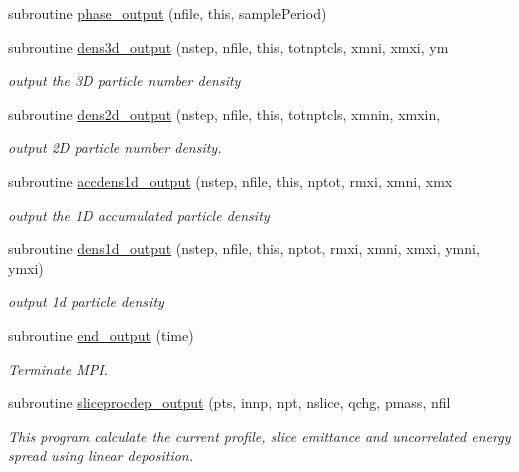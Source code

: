 \begin{DoxyCompactItemize}
\item 
subroutine \mbox{\hyperlink{namespaceoutputclass_a86742b646a584647da7837ee6fc09c89}{phase\+\_\+output}} (nfile, this, sample\+Period)
\item 
subroutine \mbox{\hyperlink{namespaceoutputclass_a49102c15c2635cf9b329a9ccb56a8db2}{dens3d\+\_\+output}} (nstep, nfile, this, totnptcls, xmni, xmxi, ym
\begin{DoxyCompactList}\small\item\em output the 3D particle number density \end{DoxyCompactList}\item 
subroutine \mbox{\hyperlink{namespaceoutputclass_ab7f55098e75e7410bbbb6ffa50148508}{dens2d\+\_\+output}} (nstep, nfile, this, totnptcls, xmnin, xmxin,
\begin{DoxyCompactList}\small\item\em output 2D particle number density. \end{DoxyCompactList}\item 
subroutine \mbox{\hyperlink{namespaceoutputclass_ac66061da2efec314c456fc5e7ed4fc8b}{accdens1d\+\_\+output}} (nstep, nfile, this, nptot, rmxi, xmni, xmx
\begin{DoxyCompactList}\small\item\em output the 1D accumulated particle density \end{DoxyCompactList}\item 
subroutine \mbox{\hyperlink{namespaceoutputclass_acc8a8c481be8eb7a7ebb49852db14185}{dens1d\+\_\+output}} (nstep, nfile, this, nptot, rmxi, xmni, xmxi, ymni, ymxi)
\begin{DoxyCompactList}\small\item\em output 1d particle density \end{DoxyCompactList}\item 
subroutine \mbox{\hyperlink{namespaceoutputclass_af40e04d104fbdb28b9cae7fb5fcba121}{end\+\_\+output}} (time)
\begin{DoxyCompactList}\small\item\em Terminate M\+PI. \end{DoxyCompactList}\item 
subroutine \mbox{\hyperlink{namespaceoutputclass_aaba51e45761070d95883093a25e402c4}{sliceprocdep\+\_\+output}} (pts, innp, npt, nslice, qchg, pmass, nfil
\begin{DoxyCompactList}\small\item\em This program calculate the current profile, slice emittance and uncorrelated energy spread using linear deposition. \end{DoxyCompactList}\end{DoxyCompactItemize}


